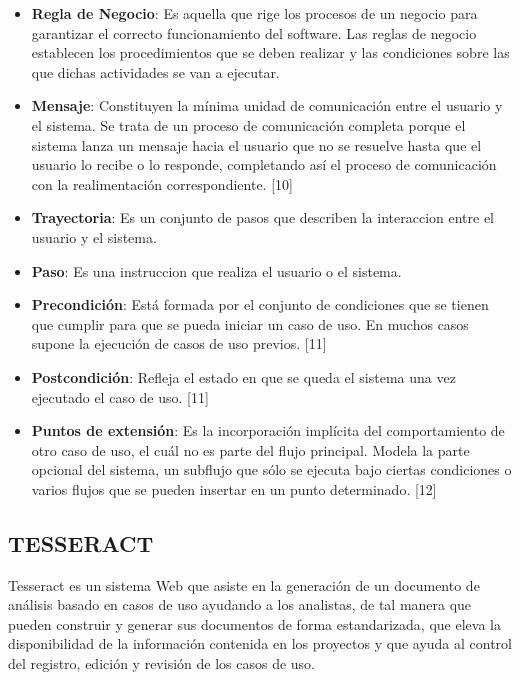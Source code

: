 \documentclass{article}
\begin{document}
\begin{multicols}{2}
\begin{itemize}
		\item \textbf{Regla de Negocio}: Es aquella que rige los procesos de un negocio para garantizar el correcto funcionamiento del software. Las reglas de negocio establecen los procedimientos que se deben realizar y las condiciones sobre las que dichas actividades se van a ejecutar.
		
		\item \textbf{Mensaje}: Constituyen la mínima unidad de comunicación entre el usuario y el sistema. Se trata de un proceso de comunicación completa porque el sistema lanza un mensaje hacia el usuario que no se resuelve hasta que el usuario lo recibe o lo responde, completando así el proceso de comunicación con la realimentación correspondiente. [10]
		
		\item \textbf{Trayectoria}: Es un conjunto de pasos que describen la interaccion entre el usuario y el sistema.
		
		\item \textbf{Paso}: Es una instruccion que realiza el usuario o el sistema.
		
		\item \textbf{Precondición}: Está formada por el conjunto de condiciones que se tienen que cumplir para que se pueda iniciar un caso de uso. En muchos casos supone la ejecución de casos de uso previos. [11]
		
		\item \textbf{Postcondición}: Refleja el estado en que se queda el sistema una vez ejecutado el caso de uso. [11]
		
		\item \textbf{Puntos de extensión}: Es la incorporación implícita del comportamiento de otro caso de uso, el cuál no es parte del flujo principal. Modela la parte opcional del sistema, un subflujo que sólo se ejecuta bajo ciertas condiciones o varios flujos que se pueden insertar en un punto determinado. [12]
	\end{itemize}

	\subsection{TESSERACT}
	
	Tesseract es un sistema Web que asiste en la generación de un documento de análisis basado en casos de uso ayudando a los analistas, de tal manera que pueden construir y generar sus documentos de forma estandarizada, que eleva la disponibilidad de la información contenida en los proyectos y que ayuda al control del registro, edición y revisión de los casos de uso.\\
	

\end{multicols}
\end{document}
